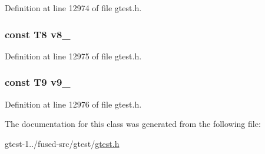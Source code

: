 \-Definition at line 12974 of file gtest.\-h.

\hypertarget{classtesting_1_1internal_1_1ValueArray46_a596bc5260b2474271d1f6910ff6f665d}{
\subsubsection[{v8\-\_\-}]{\setlength{\rightskip}{0pt plus 5cm}const \-T8 {\bf v8\-\_\-}}}\label{d5/dac/classtesting_1_1internal_1_1ValueArray46_a596bc5260b2474271d1f6910ff6f665d}


\-Definition at line 12975 of file gtest.\-h.

\hypertarget{classtesting_1_1internal_1_1ValueArray46_a6356e16cf54a9dfac8525f20242af31e}{
\subsubsection[{v9\-\_\-}]{\setlength{\rightskip}{0pt plus 5cm}const \-T9 {\bf v9\-\_\-}}}\label{d5/dac/classtesting_1_1internal_1_1ValueArray46_a6356e16cf54a9dfac8525f20242af31e}


\-Definition at line 12976 of file gtest.\-h.



\-The documentation for this class was generated from the following file\-:\begin{DoxyCompactItemize}
\item 
gtest-\/1../fused-\/src/gtest/\hyperlink{fused-src_2gtest_2gtest_8h}{gtest.\-h}\end{DoxyCompactItemize}
